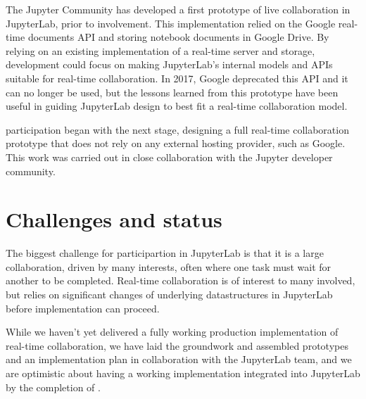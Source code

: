 \documentclass{deliverablereport}
\begin{document}
The Jupyter Community has developed a first prototype of live collaboration in JupyterLab,
prior to \ODK involvement.
This implementation relied on the Google real-time documents API and storing notebook documents in Google Drive.
By relying on an existing implementation of a real-time server and storage,
development could focus on making JupyterLab's
internal models and APIs suitable for real-time collaboration.
In 2017, Google deprecated this API and it can no longer be used,
but the lessons learned from this prototype have been useful in guiding JupyterLab design to best fit a real-time collaboration model.

\ODK participation began with the next stage, designing a full real-time collaboration prototype
that does not rely on any external hosting provider,
such as Google.
This work was carried out in close collaboration with the Jupyter developer community.



\section{Challenges and status}

The biggest challenge for \ODK participartion in JupyterLab is that it is a large collaboration, driven by many interests,
often where one task must wait for another to be completed.
Real-time collaboration is of interest to many involved,
but relies on significant changes of underlying datastructures in JupyterLab before implementation can proceed.

While we haven't yet delivered a fully working production implementation of real-time collaboration,
we have laid the groundwork and assembled prototypes and an implementation plan
in collaboration with the JupyterLab team,
and we are optimistic about having a working implementation integrated into JupyterLab by the completion of .
\end{document}

